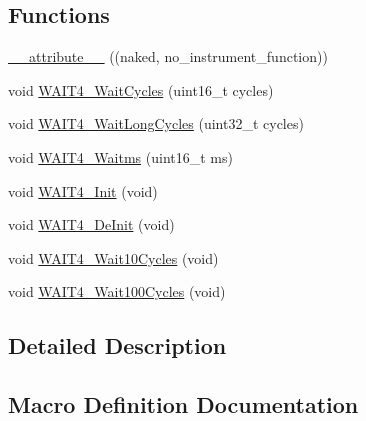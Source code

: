 \subsection*{Functions}
\begin{DoxyCompactItemize}
\item 
\hyperlink{group___w_a_i_t4__module_ga0d401ca6ca297b5b7a450deed0c42b78}{\+\_\+\+\_\+attribute\+\_\+\+\_\+} ((naked, no\+\_\+instrument\+\_\+function))
\item 
void \hyperlink{group___w_a_i_t4__module_gabf87133805bb861250d72879e13e5529}{W\+A\+I\+T4\+\_\+\+Wait\+Cycles} (uint16\+\_\+t cycles)
\item 
void \hyperlink{group___w_a_i_t4__module_ga29701aead54d6053d14056168a5ba334}{W\+A\+I\+T4\+\_\+\+Wait\+Long\+Cycles} (uint32\+\_\+t cycles)
\item 
void \hyperlink{group___w_a_i_t4__module_ga7a6804df6ef7344cfbea6873e0b574aa}{W\+A\+I\+T4\+\_\+\+Waitms} (uint16\+\_\+t ms)
\item 
void \hyperlink{group___w_a_i_t4__module_gaef55273b129791e7ae1fcae9cd2c6075}{W\+A\+I\+T4\+\_\+\+Init} (void)
\item 
void \hyperlink{group___w_a_i_t4__module_ga09cc7280289a7d767c996ed0fff93e6f}{W\+A\+I\+T4\+\_\+\+De\+Init} (void)
\item 
void \hyperlink{group___w_a_i_t4__module_gaa7a325d2f1ac59f0f47cdb80f3ed8741}{W\+A\+I\+T4\+\_\+\+Wait10\+Cycles} (void)
\item 
void \hyperlink{group___w_a_i_t4__module_ga847208f612e9c158308d347e793b8988}{W\+A\+I\+T4\+\_\+\+Wait100\+Cycles} (void)
\end{DoxyCompactItemize}


\subsection{Detailed Description}


\subsection{Macro Definition Documentation}
\mbox{\label{group___w_a_i_t4__module_ga79cc0104fa58e3905dda648c3be49cea}} 
